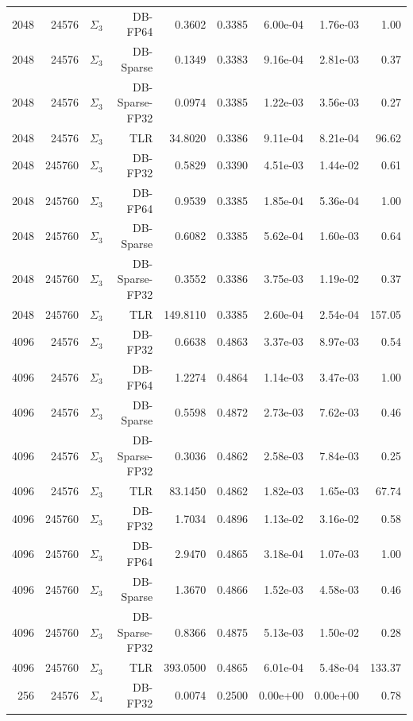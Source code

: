 \begin{tabular}{|r|r|r|r|r|r|r|r|r|}
  2048 & 24576 & $\Sigma_3$ & DB-FP64 & 0.3602 & 0.3385 & 6.00e-04 & 1.76e-03 & 1.00 \\
  2048 & 24576 & $\Sigma_3$ & DB-Sparse & 0.1349 & 0.3383 & 9.16e-04 & 2.81e-03 & 0.37 \\
  2048 & 24576 & $\Sigma_3$ & DB-Sparse-FP32 & 0.0974 & 0.3385 & 1.22e-03 & 3.56e-03 & 0.27 \\
  2048 & 24576 & $\Sigma_3$ & TLR & 34.8020 & 0.3386 & 9.11e-04 & 8.21e-04 & 96.62 \\
  2048 & 245760 & $\Sigma_3$ & DB-FP32 & 0.5829 & 0.3390 & 4.51e-03 & 1.44e-02 & 0.61 \\
  2048 & 245760 & $\Sigma_3$ & DB-FP64 & 0.9539 & 0.3385 & 1.85e-04 & 5.36e-04 & 1.00 \\
  2048 & 245760 & $\Sigma_3$ & DB-Sparse & 0.6082 & 0.3385 & 5.62e-04 & 1.60e-03 & 0.64 \\
  2048 & 245760 & $\Sigma_3$ & DB-Sparse-FP32 & 0.3552 & 0.3386 & 3.75e-03 & 1.19e-02 & 0.37 \\
  2048 & 245760 & $\Sigma_3$ & TLR & 149.8110 & 0.3385 & 2.60e-04 & 2.54e-04 & 157.05 \\
  4096 & 24576 & $\Sigma_3$ & DB-FP32 & 0.6638 & 0.4863 & 3.37e-03 & 8.97e-03 & 0.54 \\
  4096 & 24576 & $\Sigma_3$ & DB-FP64 & 1.2274 & 0.4864 & 1.14e-03 & 3.47e-03 & 1.00 \\
  4096 & 24576 & $\Sigma_3$ & DB-Sparse & 0.5598 & 0.4872 & 2.73e-03 & 7.62e-03 & 0.46 \\
  4096 & 24576 & $\Sigma_3$ & DB-Sparse-FP32 & 0.3036 & 0.4862 & 2.58e-03 & 7.84e-03 & 0.25 \\
  4096 & 24576 & $\Sigma_3$ & TLR & 83.1450 & 0.4862 & 1.82e-03 & 1.65e-03 & 67.74 \\
  4096 & 245760 & $\Sigma_3$ & DB-FP32 & 1.7034 & 0.4896 & 1.13e-02 & 3.16e-02 & 0.58 \\
  4096 & 245760 & $\Sigma_3$ & DB-FP64 & 2.9470 & 0.4865 & 3.18e-04 & 1.07e-03 & 1.00 \\
  4096 & 245760 & $\Sigma_3$ & DB-Sparse & 1.3670 & 0.4866 & 1.52e-03 & 4.58e-03 & 0.46 \\
  4096 & 245760 & $\Sigma_3$ & DB-Sparse-FP32 & 0.8366 & 0.4875 & 5.13e-03 & 1.50e-02 & 0.28 \\
  4096 & 245760 & $\Sigma_3$ & TLR & 393.0500 & 0.4865 & 6.01e-04 & 5.48e-04 & 133.37 \\
  256 & 24576 & $\Sigma_4$ & DB-FP32 & 0.0074 & 0.2500 & 0.00e+00 & 0.00e+00 & 0.78 \\

\end{tabular}
